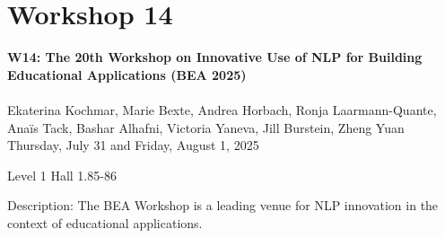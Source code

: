 \clearpage



\section[W14: The 20th Workshop on Innovative Use of NLP for Building Educational Applications (BEA 2025)]{Workshop 14}
\label{workshop_14_1}
\label{workshop_14_2}

\begin{center}
    {\Large \textbf{W14: The 20th Workshop on Innovative Use of NLP for Building Educational Applications (BEA 2025)}}\\
    \\


    Ekaterina Kochmar, Marie Bexte, Andrea Horbach, Ronja Laarmann-Quante, Anaïs Tack, Bashar Alhafni, Victoria Yaneva, Jill Burstein, Zheng Yuan\\
    
    Thursday, July 31 and Friday, August 1, 2025
    
    Level 1 Hall 1.85-86

\end{center}

Description: The BEA Workshop is a leading venue for NLP innovation in the context of educational applications.

